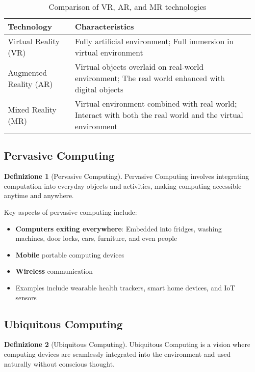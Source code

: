 \documentclass[11pt,a4paper]{article}
\theoremstyle{definition}
\newtheorem{definition}{Definizione}[section]
\theoremstyle{plain}
\theoremstyle{remark}
\begin{document}
\begin{table}[h]
\centering
\begin{tabular}{|l|p{10cm}|}
\hline
\textbf{Technology} & \textbf{Characteristics} \\
\hline
Virtual Reality (VR) & Fully artificial environment; Full immersion in virtual environment \\
\hline
Augmented Reality (AR) & Virtual objects overlaid on real-world environment; The real world enhanced with digital objects \\
\hline
Mixed Reality (MR) & Virtual environment combined with real world; Interact with both the real world and the virtual environment \\
\hline
\end{tabular}
\caption{Comparison of VR, AR, and MR technologies}
\end{table}

\subsection{Pervasive Computing}

\begin{definition}[Pervasive Computing]
Pervasive Computing involves integrating computation into everyday objects and activities, making computing accessible anytime and anywhere.
\end{definition}

Key aspects of pervasive computing include:

\begin{itemize}
    \item \textbf{Computers exiting everywhere}: Embedded into fridges, washing machines, door locks, cars, furniture, and even people
    \item \textbf{Mobile} portable computing devices
    \item \textbf{Wireless} communication
    \item Examples include wearable health trackers, smart home devices, and IoT sensors
\end{itemize}

\subsection{Ubiquitous Computing}

\begin{definition}[Ubiquitous Computing]
Ubiquitous Computing is a vision where computing devices are seamlessly integrated into the environment and used naturally without conscious thought.
\end{definition}
\end{document}
